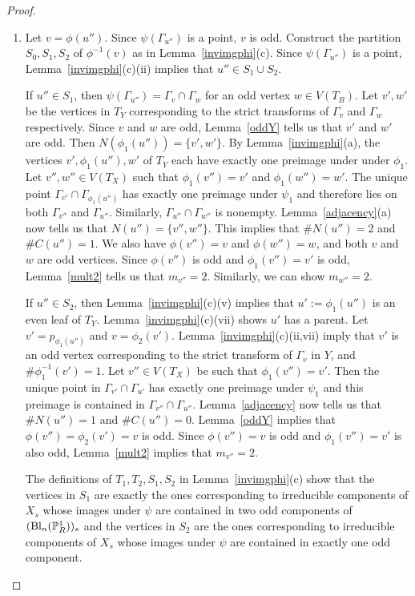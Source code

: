 \begin{proof} \hfill
\begin{enumerate}
 \item Let $v = \phi(u'')$. Since $\psi(\Gamma_{u''})$ is a point,  $v$ is odd. Construct the partition $S_0,S_1,S_2$ of $\phi^{-1}(v)$ as in Lemma~\ref{invimgphi}(c). Since $\psi(\Gamma_{u''})$ is a point, Lemma~\ref{invimgphi}(c)(ii) implies that $u'' \in S_1 \cup S_2$. 
 
If $u'' \in S_1$, then $\psi(\Gamma_{u''}) = \Gamma_v \cap \Gamma_w$ for an odd vertex $w \in V(T_B)$. Let $v',w'$ be the vertices in $T_Y$ corresponding to the strict transforms of $\Gamma_v$ and $\Gamma_w$ respectively. Since $v$ and $w$ are odd, Lemma~\ref{oddY} tells us that $v'$ and $w'$ are odd. Then $N(\phi_1(u'')) = \{ v',w' \}$. By Lemma~\ref{invimgphi}(a), the vertices $v',\phi_1(u''),w'$ of $T_Y$ each have exactly one preimage under under $\phi_1$. Let $v'',w'' \in V(T_X)$ such that $\phi_1(v'') = v'$ and $\phi_1(w'') = w'$. The unique point $\Gamma_{v'} \cap \Gamma_{\phi_1(u'')}$ has exactly one preimage under $\psi_1$ and therefore lies on both $\Gamma_{v''}$ and $\Gamma_{u''}$. Similarly, $\Gamma_{u''} \cap \Gamma_{w''}$ is nonempty. Lemma~\ref{adjacency}(a) now tells us that $N(u'') = \{v'',w'' \}$. This implies that $\# N(u'') = 2$ and $\# C(u'') = 1$. We also have $\phi(v'') = v$ and $\phi(w'') = w$, and both $v$ and $w$ are odd vertices. Since $\phi(v'')$ is odd and $\phi_1(v'') = v'$ is odd, Lemma~\ref{mult2} tells us that $m_{v''} = 2$. Similarly, we can show $m_{w''} = 2$.  
 
If $u'' \in S_2$, then Lemma~\ref{invimgphi}(c)(v) implies that $u' := \phi_1(u'')$ is an even leaf of $T_Y$. Lemma~\ref{invimgphi}(c)(vii) shows $u'$ has a parent. Let $v' = p_{\phi_1(u'')}$ and $v = \phi_2(v')$. Lemma~\ref{invimgphi}(c)(ii,vii) imply that $v'$ is an odd vertex corresponding to the strict transform of $\Gamma_v$ in $Y$, and $\# \phi_1^{-1}(v') = 1$. Let $v'' \in V(T_X)$ be such that $\phi_1(v'') = v'$. Then the unique point in $\Gamma_{v'} \cap \Gamma_{u'}$ has exactly one preimage under $\psi_1$ and this preimage is contained in $\Gamma_{v''} \cap \Gamma_{u''}$. Lemma~\ref{adjacency} now tells us that $\# N(u'') = 1$ and $\# C(u'') = 0$. Lemma~\ref{oddY} implies that $\phi(v'') = \phi_2(v') = v$ is odd. Since $\phi(v'') = v$ is odd and $\phi_1(v'') = v'$ is also odd, Lemma~\ref{mult2} implies that $m_{v''} = 2$.
 
The definitions of $T_1,T_2,S_1,S_2$ in Lemma~\ref{invimgphi}(c) show that the vertices in $S_1$ are exactly the ones corresponding to irreducible components of $X_s$ whose images under $\psi$ are contained in two odd components of $(\mathrm{Bl}_n(\P^1_R))_s$ and the vertices in $S_2$ are the ones corresponding to irreducible components of $X_s$ whose images under $\psi$ are contained in exactly one odd component. 


\end{enumerate}
\end{proof}
